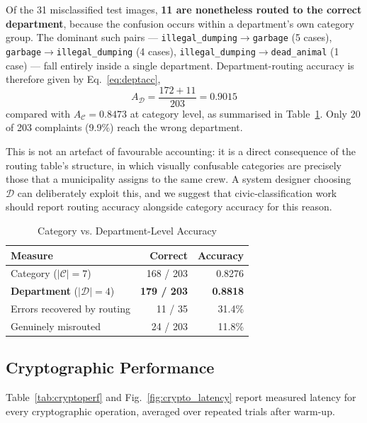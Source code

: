 \documentclass[conference]{IEEEtran}
\begin{document}
Of the 31 misclassified test images, \textbf{11 are nonetheless routed to the correct department}, because the confusion occurs within a department's own category group. The dominant such pairs --- \texttt{illegal\_dumping}$\rightarrow$\texttt{garbage} (5 cases), \texttt{garbage}$\rightarrow$\texttt{illegal\_dumping} (4 cases), \texttt{illegal\_dumping}$\rightarrow$\texttt{dead\_animal} (1 case) --- fall entirely inside a single department. Department-routing accuracy is therefore given by Eq.~\ref{eq:deptacc},
\begin{equation}
A_{\mathcal{D}} = \frac{172 + 11}{203} = 0.9015
\label{eq:deptacc}
\end{equation}
compared with $A_{\mathcal{C}} = 0.8473$ at category level, as summarised in Table~\ref{tab:deptacc}. Only 20 of 203 complaints (9.9\%) reach the wrong department.

This is not an artefact of favourable accounting: it is a direct consequence of the routing table's structure, in which visually confusable categories are precisely those that a municipality assigns to the same crew. A system designer choosing $\mathcal{D}$ can deliberately exploit this, and we suggest that civic-classification work should report routing accuracy alongside category accuracy for this reason.

\begin{table}[t]
\caption{Category vs. Department-Level Accuracy}
\label{tab:deptacc}
\centering
\small
\begin{tabular}{lrr}
\toprule
\textbf{Measure} & \textbf{Correct} & \textbf{Accuracy} \\
\midrule
Category ($|\mathcal{C}| = 7$)      & 168 / 203 & 0.8276 \\
\textbf{Department} ($|\mathcal{D}| = 4$) & \textbf{179 / 203} & \textbf{0.8818} \\
\midrule
Errors recovered by routing         & 11 / 35 & 31.4\% \\
Genuinely misrouted                 & 24 / 203 & 11.8\% \\
\bottomrule
\end{tabular}
\end{table}

\subsection{Cryptographic Performance}
\label{sec:cryptoperf}
Table~\ref{tab:cryptoperf} and Fig.~\ref{fig:crypto_latency} report measured latency for every cryptographic operation, averaged over repeated trials after warm-up.
\end{document}

